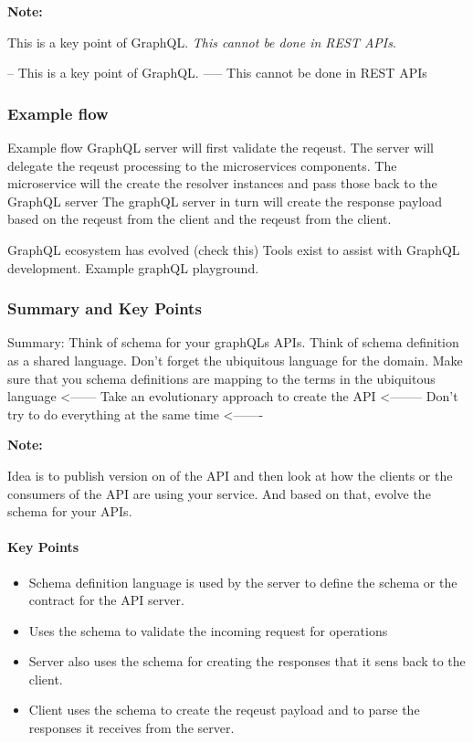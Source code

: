 \documentclass[a4paper, 11pt]{book}
\newenvironment{note}{
    \begin{siderule}
        \textbf{Note: }
        }{
    \end{siderule}
}
\begin{document}
    \begin{note}
        This is a key point of GraphQL. \textit{This cannot be done in REST APIs}.
    \end{note}
    -- This is a key point of GraphQL.
    ----- This cannot be done in REST APIs

    \subsubsection{Example flow}
    Example flow
    GraphQL server will first validate the reqeust.
    The server will delegate the reqeust processing to the microservices components.
    The microservice will the create the resolver instances and pass those back to the GraphQL server
    The graphQL server in turn will create the response payload based on the reqeust from the client and the reqeust from the client.

    GraphQL ecosystem has evolved (check this)
    Tools exist to assist with GraphQL development.
    Example graphQL playground.

    \subsubsection{Summary and Key Points}
    Summary:
    Think of schema for your graphQLs APIs.
    Think of schema definition as a shared language.
    Don't forget the ubiquitous language for the domain.
    Make sure that you schema definitions are mapping to the terms in the ubiquitous language <------
    Take an evolutionary approach to create the API <--------
    Don't try to do everything at the same time <-------

    \begin{note}
        Idea is to publish version on of the API and then look at how the clients or the consumers of the API are using your service.
        And based on that, evolve the schema for your APIs.
    \end{note}

    \paragraph{Key Points}
    \begin{itemize}
        \item Schema definition language is used by the server to define the schema or the contract for the API server.
        \item Uses the schema to validate the incoming request for operations
        \item Server also uses the schema for creating the responses that it sens back to the client.
        \item Client uses the schema to create the reqeust payload and to parse the responses it receives from the server.
    \end{itemize}

\end{document}
